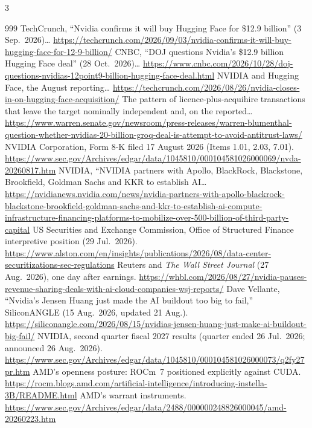 \begin{multicols}{3}
\begin{thebibliography}{999}
 TechCrunch, ``Nvidia confirms it will buy Hugging Face for \$12.9 billion'' (3 Sep.\ 2026)… \url{https://techcrunch.com/2026/09/03/nvidia-confirms-it-will-buy-hugging-face-for-12-9-billion/}
 CNBC, ``DOJ questions Nvidia's \$12.9 billion Hugging Face deal'' (28 Oct.\ 2026)… \url{https://www.cnbc.com/2026/10/28/doj-questions-nvidias-12point9-billion-hugging-face-deal.html}
 NVIDIA and Hugging Face, the August reporting… \url{https://techcrunch.com/2026/08/26/nvidia-closes-in-on-hugging-face-acquisition/}
 The pattern of licence-plus-acquihire transactions that leave the target nominally independent and, on the reported… \url{https://www.warren.senate.gov/newsroom/press-releases/warren-blumenthal-question-whether-nvidias-20-billion-groq-deal-is-attempt-to-avoid-antitrust-laws/}
 NVIDIA Corporation, Form 8-K filed 17 August 2026 (Items 1.01, 2.03, 7.01). \url{https://www.sec.gov/Archives/edgar/data/1045810/000104581026000069/nvda-20260817.htm}
 NVIDIA, ``NVIDIA partners with Apollo, BlackRock, Blackstone, Brookfield, Goldman Sachs and KKR to establish AI… \url{https://nvidianews.nvidia.com/news/nvidia-partners-with-apollo-blackrock-blackstone-brookfield-goldman-sachs-and-kkr-to-establish-ai-compute-infrastructure-financing-platforms-to-mobilize-over-500-billion-of-third-party-capital}
 US Securities and Exchange Commission, Office of Structured Finance interpretive position (29 Jul.\ 2026). \url{https://www.alston.com/en/insights/publications/2026/08/data-center-securitizations-sec-regulations}
 Reuters and \emph{The Wall Street Journal} (27 Aug.\ 2026), one day after earnings. \url{https://whbl.com/2026/08/27/nvidia-pauses-revenue-sharing-deals-with-ai-cloud-companies-wsj-reports/}
 Dave Vellante, ``Nvidia's Jensen Huang just made the AI buildout too big to fail,'' SiliconANGLE (15 Aug.\ 2026, updated 21 Aug.). \url{https://siliconangle.com/2026/08/15/nvidias-jensen-huang-just-make-ai-buildout-big-fail/}
 NVIDIA, second quarter fiscal 2027 results (quarter ended 26 Jul.\ 2026; announced 26 Aug.\ 2026). \url{https://www.sec.gov/Archives/edgar/data/1045810/000104581026000073/q2fy27pr.htm}
 AMD's openness posture: ROCm~7 positioned explicitly against CUDA. \url{https://rocm.blogs.amd.com/artificial-intelligence/introducing-instella-3B/README.html}
 AMD's warrant instruments. \url{https://www.sec.gov/Archives/edgar/data/2488/000000248826000045/amd-20260223.htm}

\end{thebibliography}
\end{multicols}
